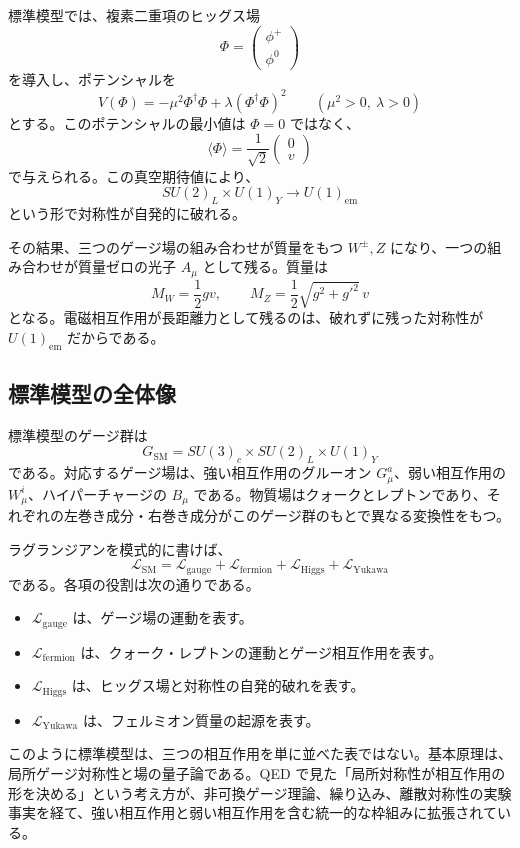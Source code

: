 標準模型では、複素二重項のヒッグス場
\[
\Phi=
\begin{pmatrix}
\phi^+\\
\phi^0
\end{pmatrix}
\]
を導入し、ポテンシャルを
\[
V(\Phi)
=
-\mu^2\Phi^\dagger\Phi
+\lambda(\Phi^\dagger\Phi)^2
\qquad(\mu^2>0,\ \lambda>0)
\]
とする。このポテンシャルの最小値は $\Phi=0$ ではなく、
\[
\langle\Phi\rangle
=
\frac{1}{\sqrt{2}}
\begin{pmatrix}
0\\
v
\end{pmatrix}
\]
で与えられる。この真空期待値により、
\[
SU(2)_L\times U(1)_Y
\longrightarrow
U(1)_{\mathrm{em}}
\]
という形で対称性が自発的に破れる。

その結果、三つのゲージ場の組み合わせが質量をもつ $W^\pm,Z$ になり、一つの組み合わせが質量ゼロの光子 $A_\mu$ として残る。質量は
\[
M_W=\frac{1}{2}gv,
\qquad
M_Z=\frac{1}{2}\sqrt{g^2+g'^2}\,v
\]
となる。電磁相互作用が長距離力として残るのは、破れずに残った対称性が $U(1)_{\mathrm{em}}$ だからである。

\subsection{標準模型の全体像}
標準模型のゲージ群は
\[
G_{\mathrm{SM}}
=
SU(3)_c\times SU(2)_L\times U(1)_Y
\]
である。対応するゲージ場は、強い相互作用のグルーオン $G_\mu^a$、弱い相互作用の $W_\mu^i$、ハイパーチャージの $B_\mu$ である。物質場はクォークとレプトンであり、それぞれの左巻き成分・右巻き成分がこのゲージ群のもとで異なる変換性をもつ。

ラグランジアンを模式的に書けば、
\[
\mathcal{L}_{\mathrm{SM}}
=
\mathcal{L}_{\mathrm{gauge}}
+\mathcal{L}_{\mathrm{fermion}}
+\mathcal{L}_{\mathrm{Higgs}}
+\mathcal{L}_{\mathrm{Yukawa}}
\]
である。各項の役割は次の通りである。
\begin{itemize}
\item $\mathcal{L}_{\mathrm{gauge}}$ は、ゲージ場の運動を表す。
\item $\mathcal{L}_{\mathrm{fermion}}$ は、クォーク・レプトンの運動とゲージ相互作用を表す。
\item $\mathcal{L}_{\mathrm{Higgs}}$ は、ヒッグス場と対称性の自発的破れを表す。
\item $\mathcal{L}_{\mathrm{Yukawa}}$ は、フェルミオン質量の起源を表す。
\end{itemize}

このように標準模型は、三つの相互作用を単に並べた表ではない。基本原理は、局所ゲージ対称性と場の量子論である。QED で見た「局所対称性が相互作用の形を決める」という考え方が、非可換ゲージ理論、繰り込み、離散対称性の実験事実を経て、強い相互作用と弱い相互作用を含む統一的な枠組みに拡張されている。
